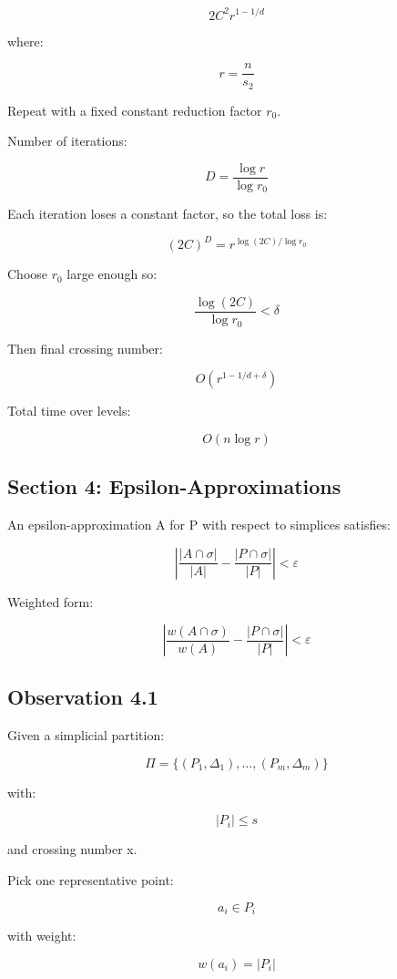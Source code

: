 \documentclass[
  11pt,
]{article}
\begin{document}
\[
2C^2 r^{1-1/d}
\]

where:

\[
r=\frac{n}{s_2}
\]

Repeat with a fixed constant reduction factor \(r_0\).

Number of iterations:

\[
D=\frac{\log r}{\log r_0}
\]

Each iteration loses a constant factor, so the total loss is:

\[
(2C)^D = r^{\log(2C)/\log r_0}
\]

Choose \(r_0\) large enough so:

\[
\frac{\log(2C)}{\log r_0}< \delta
\]

Then final crossing number:

\[
O(r^{1-1/d+\delta})
\]

Total time over levels:

\[
O(n\log r)
\]

\hypertarget{section-4-epsilon-approximations}{%
\subsection{Section 4:
Epsilon-Approximations}\label{section-4-epsilon-approximations}}

An epsilon-approximation A for P with respect to simplices satisfies:

\[
\left| \frac{|A\cap\sigma|}{|A|} - \frac{|P\cap\sigma|}{|P|} \right| < \varepsilon
\]

Weighted form:

\[
\left| \frac{w(A\cap\sigma)}{w(A)} - \frac{|P\cap\sigma|}{|P|} \right| < \varepsilon
\]

\hypertarget{observation-4.1}{%
\subsection{Observation 4.1}\label{observation-4.1}}

Given a simplicial partition:

\[
\Pi=\lbrace (P_1,\Delta_1),\ldots,(P_m,\Delta_m) \rbrace
\]

with:

\[
|P_i|\le s
\]

and crossing number x.

Pick one representative point:

\[
a_i\in P_i
\]

with weight:

\[
w(a_i)=|P_i|
\]
\end{document}
